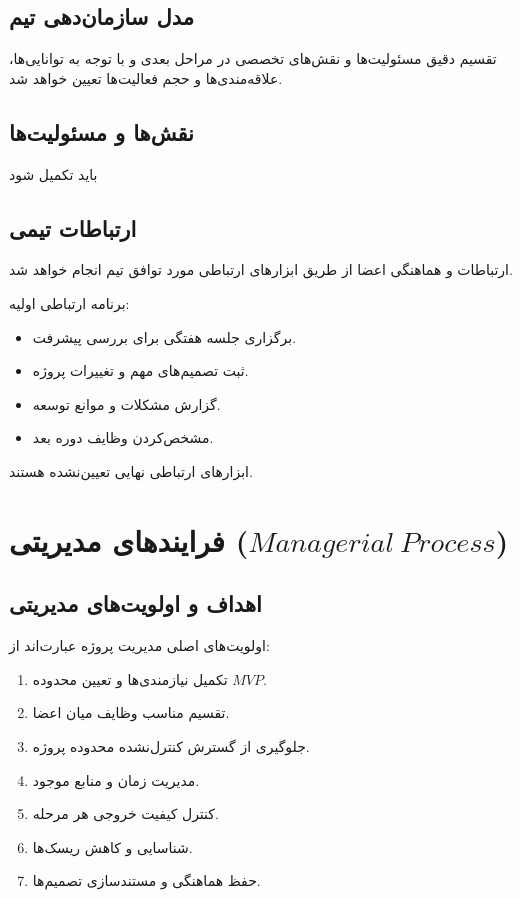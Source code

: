 \documentclass[12pt,a4paper]{article}
\begin{document}
	\subsection{مدل سازمان‌دهی تیم}
	
	تقسیم دقیق مسئولیت‌ها و نقش‌های تخصصی
	در مراحل بعدی و با توجه به توانایی‌ها،
	علاقه‌مندی‌ها و حجم فعالیت‌ها تعیین خواهد شد.
	
	\subsection{نقش‌ها و مسئولیت‌ها}
	باید تکمیل شود
	
	
	\subsection{ارتباطات تیمی}
	
	ارتباطات و هماهنگی اعضا از طریق ابزارهای
	ارتباطی مورد توافق تیم انجام خواهد شد.
	
	برنامه ارتباطی اولیه:
	
	\begin{itemize}
		\item برگزاری جلسه هفتگی برای بررسی پیشرفت.
		\item ثبت تصمیم‌های مهم و تغییرات پروژه.
		\item گزارش مشکلات و موانع توسعه.
		\item مشخص‌کردن وظایف دوره بعد.
	\end{itemize}
	
	ابزارهای ارتباطی نهایی تعیین‌نشده هستند.
	
	
	\section{فرایندهای مدیریتی ($Managerial\ Process$)}
	
	\subsection{اهداف و اولویت‌های مدیریتی}
	
	اولویت‌های اصلی مدیریت پروژه عبارت‌اند از:
	
	\begin{enumerate}
		\item تکمیل نیازمندی‌ها و تعیین محدوده $MVP$.
		\item تقسیم مناسب وظایف میان اعضا.
		\item جلوگیری از گسترش کنترل‌نشده محدوده پروژه.
		\item مدیریت زمان و منابع موجود.
		\item کنترل کیفیت خروجی هر مرحله.
		\item شناسایی و کاهش ریسک‌ها.
		\item حفظ هماهنگی و مستندسازی تصمیم‌ها.
	\end{enumerate}
	
\end{document}
